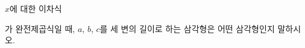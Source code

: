 $x$에 대한 이차식 \par\smallskip{}\par\smallskip\noindent 가 완전제곱식일 때, $a$, $b$, $c$를 세 변의 길이로 하는 삼각형은 어떤 삼각형인지 말하시오.
